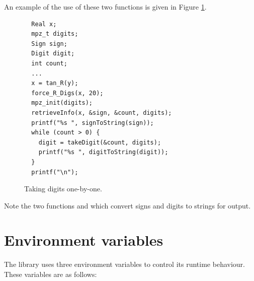 \documentclass[a4paper,12pt]{article}
\begin{document}
\noindent An example of the use of these two functions is given in Figure
\ref{fig:digits-info}.

\begin{figure}[htp]
\begin{verbatim}
  Real x;
  mpz_t digits;
  Sign sign;
  Digit digit;
  int count;
  ...
  x = tan_R(y);
  force_R_Digs(x, 20);
  mpz_init(digits);
  retrieveInfo(x, &sign, &count, digits);
  printf("%s ", signToString(sign));
  while (count > 0) {
    digit = takeDigit(&count, digits);
    printf("%s ", digitToString(digit));
  }
  printf("\n");
\end{verbatim}
\caption{Taking digits one-by-one.}
\label{fig:digits-info}
\end{figure}

Note the two functions  and 
which convert signs and digits to strings for output.

\section{Environment variables}

The library uses three environment variables to control its runtime behaviour.
These variables are as follows:
\end{document}
